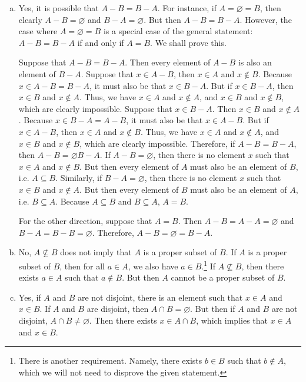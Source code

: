 \documentclass[11pt,letterpaper]{article}
\begin{document}
\sol 
\begin{enumerate}[(a)]
\item Yes, it is possible that $A - B= B - A$. For instance, if $A= \varnothing= B$, then clearly $A - B= \varnothing$ and $B - A= \varnothing$. But then $A - B= B - A$. However, the case where $A= \varnothing= B$ is a special case of the general statement: $A - B= B - A$ if and only if $A= B$. We shall prove this. \pspace

Suppose that $A - B= B - A$. Then every element of $A - B$ is also an element of $B - A$. Suppose that $x \in A - B$, then $x \in A$ and $x \notin B$. Because $x \in A - B= B - A$, it must also be that $x \in B - A$. But if $x \in B - A$, then $x \in B$ and $x \notin A$. Thus, we have $x \in A$ and $x \notin A$, and $x \in B$ and $x \notin B$, which are clearly impossible. Suppose that $x \in B - A$. Then $x \in B$ and $x \notin A$. Because $x \in B - A= A - B$, it must also be that $x \in A - B$. But if $x \in A - B$, then $x \in A$ and $x \notin B$. Thus, we have $x \in A$ and $x \notin A$, and $x \in B$ and $x \notin B$, which are clearly impossible. Therefore, if $A - B= B - A$, then $A - B= \varnothing B - A$. If $A - B= \varnothing$, then there is no element $x$ such that $x \in A$ and $x \notin B$. But then every element of $A$ must also be an element of $B$, i.e. $A \subseteq B$. Similarly, if $B - A= \varnothing$, then there is no element $x$ such that $x \in B$ and $x \notin A$. But then every element of $B$ must also be an element of $A$, i.e. $B \subseteq A$. Because $A \subseteq B$ and $B \subseteq A$, $A= B$. \pspace

For the other direction, suppose that $A= B$. Then $A - B= A - A= \varnothing$ and $B - A= B - B= \varnothing$. Therefore, $A - B= \varnothing= B - A$. 

\item No, $A \not\subseteq B$ does not imply that $A$ is a proper subset of $B$. If $A$ is a proper subset of $B$, then for all $a \in A$, we also have $a \in B$.\footnote{There is another requirement. Namely, there exists $b \in B$ such that $b \notin A$, which we will not need to disprove the given statement.} If $A \not\subseteq B$, then there exists $a \in A$ such that $a \notin B$. But then $A$ cannot be a proper subset of $B$. \pspace

\item Yes, if $A$ and $B$ are not disjoint, there is an element such that $x \in A$ and $x \in B$. If $A$ and $B$ are disjoint, then $A \cap B= \varnothing$. But then if $A$ and $B$ are not disjoint, $A \cap B \neq \varnothing$. Then there exists $x \in A \cap B$, which implies that $x \in A$ and $x \in B$. \pspace


\end{enumerate}
\end{document}
